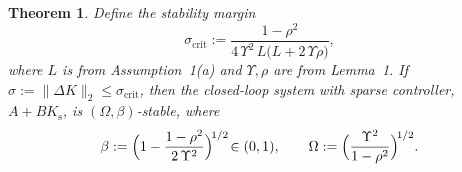 \documentclass[conference]{IEEEtran}
\newtheorem{theorem}{Theorem}
\begin{document}
\begin{theorem}
\label{thm:lyap-stab} Define the stability margin
\begin{equation}\label{eq:sigma-crit}
  \sigma_{\mathrm{crit}}
  := \frac{1 - \rho^{2}}{4\,\Upsilon^{2}\,L
       \bigl(L + 2\,\Upsilon\rho\bigr)},
\end{equation}
where $L$ is from Assumption~1(a) and
$\Upsilon,\rho$ are from Lemma~1.
If $\sigma := \|\Delta K\|_2 \le \sigma_{\mathrm{crit}}$, then the closed-loop system with sparse controller, 
$A+BK_{\mathrm{s}}$, is $(\Omega,\beta)$-stable, where
\begin{equation}\label{eq:omega-beta}
  \beta :=
    \Bigl(1 - \frac{1-\rho^{2}}{2\,\Upsilon^{2}}\Bigr)^{\!1/2}
    \!\in (0,1),
  \qquad
  \Omega :=
    \Bigl(\frac{\Upsilon^{2}}{1-\rho^{2}}\Bigr)^{\!1/2}.
\end{equation}
\end{theorem}
\end{document}

